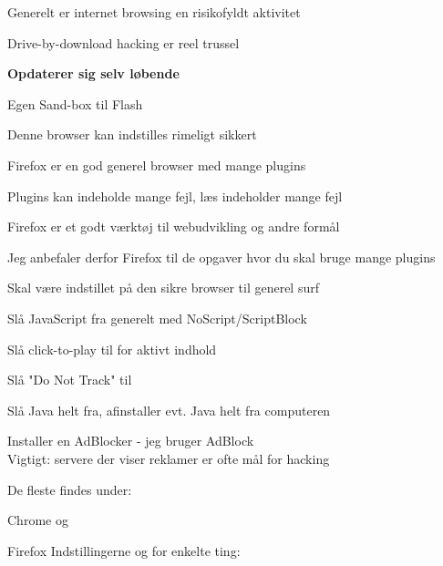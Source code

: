 \documentclass[20pt,landscape,a4paper,footrule]{foils}
\begin{document}


\begin{list1}
\item Generelt er internet browsing en risikofyldt aktivitet
\item Drive-by-download hacking er reel trussel
\item {\bf Opdaterer sig selv løbende}
\item Egen Sand-box til Flash
\item Denne browser kan indstilles rimeligt sikkert
\end{list1}


\begin{list2}
\item Firefox er en god generel browser med mange plugins
\item Plugins kan indeholde mange fejl, læs indeholder mange fejl
\item Firefox er et godt værktøj til webudvikling og andre formål

\end{list2}

\centerline{Jeg anbefaler derfor Firefox til de opgaver hvor du skal bruge mange plugins}



\begin{list1}
\item Skal være indstillet på den sikre browser til generel surf
\begin{list2}
\item Slå JavaScript fra generelt med NoScript/ScriptBlock
\item Slå click-to-play til for aktivt indhold
\item Slå "Do Not Track" til
\item Slå Java helt fra, afinstaller evt. Java helt fra computeren
\item Installer en AdBlocker - jeg bruger AdBlock\\
Vigtigt: servere der viser reklamer er ofte mål for hacking
\end{list2}
\end{list1}



De fleste findes under:
\begin{list2}
\item Chrome  og 
\item Firefox Indstillingerne og for enkelte ting: 
\end{list2}
\end{document}
